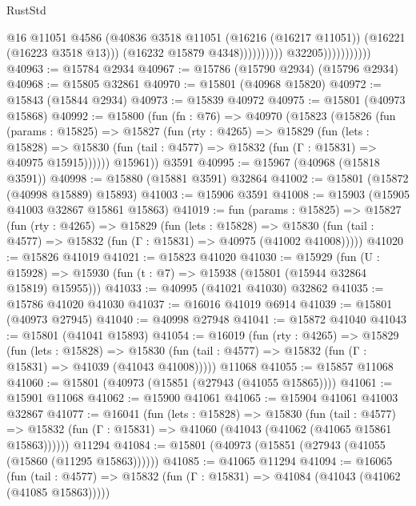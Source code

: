 \begin{lexlean}{RustStd}
\begin{coremodule}
                                            @16
                                            @11051
                                            @4586
                                            (@40836
                                              @3518
                                              @11051
                                              (@16216 (@16217 @11051))
                                              (@16221 (@16223 @3518 @13)))
                                            (@16232 @15879 @4348))))))))))
                          @32205)))))))))))
@40963 := @15784 @2934
@40967 := @15786 (@15790 @2934) (@15796 @2934)
@40968 := @15805 @32861
@40970 := @15801 (@40968 @15820)
@40972 := @15843 (@15844 @2934)
@40973 := @15839 @40972
@40975 := @15801 (@40973 @15868)
@40992 := @15800
    (fun (fn : @76) =>
    @40970
      (@15823
        (@15826
          (fun (params : @15825) =>
          @15827
            (fun (rty : @4265) =>
            @15829
              (fun (lets : @15828) =>
              @15830 (fun (tail : @4577) => @15832 (fun (Γ : @15831) => @40975 @15915))))))
        @15961))
    @3591
@40995 := @15967 (@40968 (@15818 @3591))
@40998 := @15880 (@15881 @3591) @32864
@41002 := @15801 (@15872 (@40998 @15889) @15893)
@41003 := @15906 @3591
@41008 := @15903 (@15905 @41003 @32867 @15861 @15863)
@41019 := fun (params : @15825) =>
  @15827
    (fun (rty : @4265) =>
    @15829
      (fun (lets : @15828) =>
      @15830 (fun (tail : @4577) => @15832 (fun (Γ : @15831) => @40975 (@41002 @41008)))))
@41020 := @15826 @41019
@41021 := @15823 @41020
@41030 := @15929
    (fun (U : @15928) => @15930 (fun (t : @7) => @15938 (@15801 (@15944 @32864 @15819) @15955)))
@41033 := @40995 (@41021 @41030) @32862
@41035 := @15786 @41020 @41030
@41037 := @16016 @41019 @6914
@41039 := @15801 (@40973 @27945)
@41040 := @40998 @27948
@41041 := @15872 @41040
@41043 := @15801 (@41041 @15893)
@41054 := @16019
    (fun (rty : @4265) =>
    @15829
      (fun (lets : @15828) =>
      @15830 (fun (tail : @4577) => @15832 (fun (Γ : @15831) => @41039 (@41043 @41008)))))
    @11068
@41055 := @15857 @11068
@41060 := @15801 (@40973 (@15851 (@27943 (@41055 @15865))))
@41061 := @15901 @11068
@41062 := @15900 @41061
@41065 := @15904 @41061 @41003 @32867
@41077 := @16041
    (fun (lets : @15828) =>
    @15830
      (fun (tail : @4577) =>
      @15832 (fun (Γ : @15831) => @41060 (@41043 (@41062 (@41065 @15861 @15863))))))
    @11294
@41084 := @15801 (@40973 (@15851 (@27943 (@41055 (@15860 (@11295 @15863))))))
@41085 := @41065 @11294
@41094 := @16065
    (fun (tail : @4577) => @15832 (fun (Γ : @15831) => @41084 (@41043 (@41062 (@41085 @15863)))))

\end{coremodule}
\end{lexlean}
